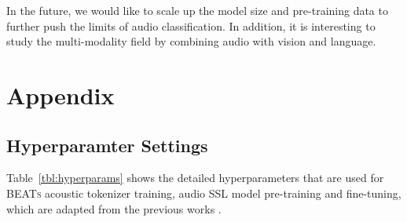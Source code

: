 \documentclass{article}
\theoremstyle{plain}
\theoremstyle{definition}
\theoremstyle{remark}
\newcommand\our{\textsc{BEATs}}
\begin{document}
In the future, we would like to scale up the model size and pre-training data to further push the limits of audio classification. In addition, it is interesting to study the multi-modality field by combining audio with vision and language. 



\appendix


\section{Appendix}

\subsection{Hyperparamter Settings}
\label{ssec:hyper}
Table~\ref{tbl:hyperparams} shows the detailed hyperparameters that are used for \our{} acoustic tokenizer training, audio SSL model pre-training and fine-tuning, which are adapted from the previous works \citep{xu2022masked,chen2022wavlm,beitv2}.
\end{document}
